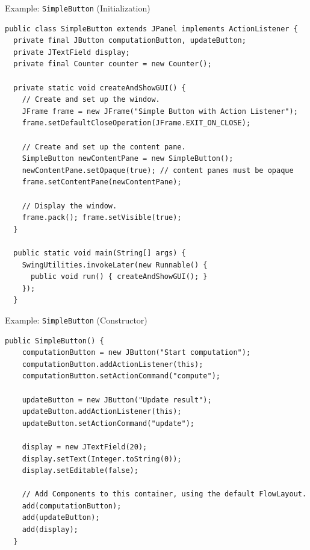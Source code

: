 \begin{frame}[fragile]{Example: \lstinline{SimpleButton} (Initialization)}
\begin{lstlisting}[basicstyle=\fontsize{7}{9}\selectfont\ttfamily]
public class SimpleButton extends JPanel implements ActionListener {
  private final JButton computationButton, updateButton;
  private JTextField display;
  private final Counter counter = new Counter();

  private static void createAndShowGUI() {
    // Create and set up the window.
    JFrame frame = new JFrame("Simple Button with Action Listener");
    frame.setDefaultCloseOperation(JFrame.EXIT_ON_CLOSE);

    // Create and set up the content pane.
    SimpleButton newContentPane = new SimpleButton();
    newContentPane.setOpaque(true); // content panes must be opaque
    frame.setContentPane(newContentPane);

    // Display the window.
    frame.pack(); frame.setVisible(true);
  }

  public static void main(String[] args) {
    SwingUtilities.invokeLater(new Runnable() {
      public void run() { createAndShowGUI(); }
    });
  }
\end{lstlisting}
\end{frame}

\begin{frame}[fragile]{Example: \lstinline{SimpleButton} (Constructor)}
\begin{lstlisting}[basicstyle=\fontsize{7}{9}\selectfont\ttfamily]
  public SimpleButton() {
    computationButton = new JButton("Start computation");
    computationButton.addActionListener(this);
    computationButton.setActionCommand("compute");

    updateButton = new JButton("Update result");
    updateButton.addActionListener(this);
    updateButton.setActionCommand("update");

    display = new JTextField(20);
    display.setText(Integer.toString(0));
    display.setEditable(false);

    // Add Components to this container, using the default FlowLayout.
    add(computationButton);
    add(updateButton);
    add(display);
  }
\end{lstlisting}
\end{frame}

